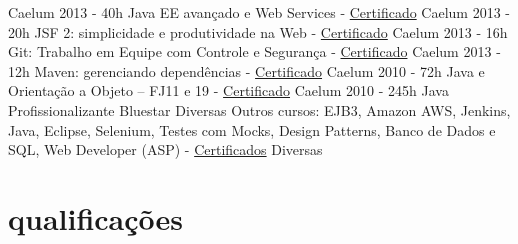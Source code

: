\begin{entrylistii}
    {Caelum}
  \entryii
    {2013 - 40h}
    {Java EE avançado e Web Services - \href{https://www.alura.com.br/user/3311/fullCertificate/bdd8817990ef209f0fb6b049f2d2ea0c}{Certificado}}
    {Caelum}
  \entryii
    {2013 - 20h}
    {JSF 2: simplicidade e produtividade na Web - \href{https://www.alura.com.br/user/3311/fullCertificate/bdd8817990ef209f0fb6b049f2d2ea0c}{Certificado}}
    {Caelum}
  \entryii
    {2013 - 16h}
    {Git: Trabalho em Equipe com Controle e Segurança - \href{https://www.alura.com.br/user/3311/fullCertificate/bdd8817990ef209f0fb6b049f2d2ea0c}{Certificado}}
    {Caelum}
  \entryii
    {2013 - 12h}
    {Maven: gerenciando dependências - \href{https://www.alura.com.br/user/3311/fullCertificate/bdd8817990ef209f0fb6b049f2d2ea0c}{Certificado}}
    {Caelum}
  \entryii
    {2010 - 72h}
    {Java e Orientação a Objeto – FJ11 e 19 - \href{https://www.alura.com.br/user/3311/fullCertificate/bdd8817990ef209f0fb6b049f2d2ea0c}{Certificado}}
    {Caelum}
  \entryii
    {2010 - 245h}
    {Java Profissionalizante}
    {Bluestar}
  \entryii
    {Diversas}
    {Outros cursos: EJB3, Amazon AWS, Jenkins, Java, Eclipse, Selenium, Testes com Mocks, Design Patterns, Banco de Dados e SQL, Web Developer (ASP) - \href{https://www.alura.com.br/user/3311/fullCertificate/bdd8817990ef209f0fb6b049f2d2ea0c}{Certificados}}
    {Diversas}
\end{entrylistii}

\newpage

\section{qualificações}

